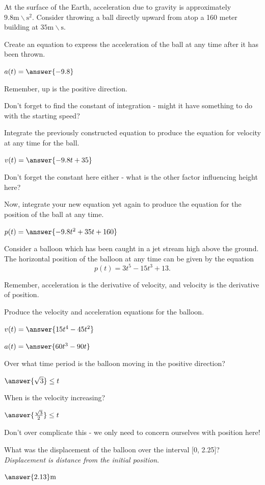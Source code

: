 \documentclass{ximera}
\begin{document}
\begin{question}
At the surface of the Earth, acceleration due to gravity is approximately $9.8 \text{m} \backslash \text{s}^2$. Consider throwing a ball directly upward from atop a 160 meter building at $35 \text{m}\backslash \text{s}$.

Create an equation to express the acceleration of the ball at any time after it has been thrown.

$a(t) = \answer{-9.8}$
\begin{feedback}
Remember, up is the positive direction.
\end{feedback}

\begin{hint}
Don't forget to find the constant of integration - might it have something to do with the starting speed?
\end{hint}
Integrate the previously constructed equation to produce the equation for velocity at any time for the ball.

$v(t) = \answer{-9.8t+35}$

\begin{hint}
Don't forget the constant here either - what is the other factor influencing height here?
\end{hint}
Now, integrate your new equation yet again to produce the equation for the position of the ball at any time.

$p(t) = \answer{-9.8t^2+35t+160}$
\end{question}
\begin{question}
Consider a balloon which has been caught in a jet stream high above the ground. The horizontal position of the balloon at any time can be given by the equation $$p(t) = 3t^5-15t^3+13\text{.}$$

\begin{hint}
Remember, acceleration is the derivative of velocity, and velocity is the derivative of position.
\end{hint}
Produce the velocity and acceleration equations for the balloon.

$v(t) = \answer{15t^4-45t^2}$

$a(t) = \answer{60t^3-90t}$

Over what time period is the balloon moving in the positive direction?

$\answer{\sqrt{3}} \leq t$

When is the velocity increasing?

$\answer{\frac{\sqrt{3}}{2}} \leq t$

\begin{hint}
Don't over complicate this - we only need to concern ourselves with position here!
\end{hint}
What was the displacement of the balloon over the interval [0, 2.25]? \textit{Displacement is distance from the initial position}.

$\answer{2.13} \text{m}$
\end{question}
\end{document}
